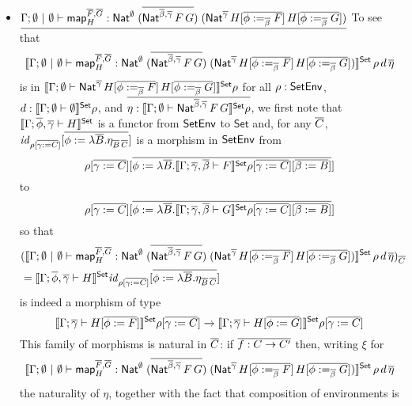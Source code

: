 \documentclass{lmcs}
\theoremstyle{plain}\newtheorem{satz}[thm]{Satz}
\newcommand{\set}{\mathsf{Set}}
\renewcommand{\id}{\mathit{id}}
\newcommand{\map}{\mathsf{map}}
\begin{document}
{\begin{itemize}
\item 
  $\underline{\Gamma;\emptyset~|~\emptyset \vdash
  \map^{\ol{F},\ol{G}}_H :
  \Nat^\emptyset\;(\ol{\Nat^{\ol{\beta},\ol{\gamma}}\,F\,G})\;
  (\Nat^{\ol{\gamma}}\,H[\ol{\phi :=_{\ol{\beta}} F}]\,H[\ol{\phi
      :=_{\ol{\beta}} G}])}$\;
To see that
\[
\setsem{\Gamma; \emptyset~|~\emptyset \vdash \map^{\ol{F},\ol{G}}_H
    : \Nat^\emptyset\;(\ol{\Nat^{\ol{\beta},\ol{\gamma}}\,F\,G})\;
    (\Nat^{\ol{\gamma}}\,H[\ol{\phi :=_{\ol{\beta}} F}]\,H[\ol{\phi
        :=_{\ol{\beta}} G}])}\,\rho\,d\, \ol{\eta}
\]
is in $\setsem{\Gamma; \emptyset \vdash
    \Nat^{\ol{\gamma}}\,H[\ol{\phi :=_{\ol{\beta}} F}]\,H[\ol{\phi
        :=_{\ol{\beta}} G}]} \rho$
for all $\rho : \mathsf{SetEnv}$, $d : \setsem{\Gamma;\emptyset \vdash \emptyset} \rho$,
and $\ol{\eta : \setsem{\Gamma; \emptyset
  \vdash\Nat^{\ol{\beta},\ol{\gamma}}\,F\,G} \rho}$,
  we first note that
$\setsem{\Gamma ;\ol{\phi}, \ol{\gamma} \vdash H}$ is a functor from
  $\mathsf{SetEnv}$ to $\set$ and, for any $\overline{C}$, $\id_{\rho[\ol{\gamma :=
        C}]}[\ol{\phi := \lambda \ol{B}. \eta_{\ol{B}\,\ol{C}}}]$ is a
  morphism in $\mathsf{SetEnv}$ from \[\rho[\ol{\gamma := C}][\ol{\phi :=
      \lambda \ol{B}.\setsem{\Gamma; \ol{\gamma},\ol{\beta} \vdash
        F}\rho[\ol{\gamma := C}][\ol{\beta := B}]}]\] to
\[\rho[\ol{\gamma := C}][\ol{\phi := \lambda \ol{B}.\setsem{\Gamma;
\ol{\gamma},\ol{\beta} \vdash G}\rho[\ol{\gamma := C}][\ol{\beta := B}]}]\]
so that
\begin{align*}
&(\setsem{\Gamma; \emptyset~|~\emptyset \vdash
  \map^{\ol{F},\ol{G}}_H :
\Nat^\emptyset\;(\ol{\Nat^{\ol{\beta},\ol{\gamma}}\,F\,G})\;
(\Nat^{\ol{\gamma}}\,H[\ol{\phi :=_{\ol{\beta}} F}]\,H[\ol{\phi
    :=_{\ol{\beta}} G}])}\,\rho\,d\, \ol{\eta})_{\ol{C}} \\
  &=  \setsem{\Gamma; \ol{\phi},\ol{\gamma} \vdash H}\id_{\rho[\ol{\gamma
      := C}]}[\ol{\phi := \lambda \ol{B}. \eta_{\ol{B}\,\ol{C}}}]
\end{align*}
is indeed a morphism of type
$$\setsem{\Gamma ;\ol{\gamma} \vdash H[\ol{\phi := F}]}\rho[\ol{\gamma
      := C}]%
\to 
\setsem{\Gamma ;\ol{\gamma} \vdash H[\ol{\phi := G}]}\rho[\ol{\gamma
      := C}]$$
This family of morphisms is natural in $\overline{C}$: if $\overline{f : C \to C'}$
then, writing $\xi$ for
\[
\setsem{\Gamma; \emptyset~|~\emptyset \vdash \map^{\ol{F},\ol{G}}_H
    : \Nat^\emptyset\;(\ol{\Nat^{\ol{\beta},\ol{\gamma}}\,F\,G})\;
    (\Nat^{\ol{\gamma}}\,H[\ol{\phi :=_{\ol{\beta}} F}]\,H[\ol{\phi
        :=_{\ol{\beta}} G}])}\,\rho\,d\, \ol{\eta}
\]
the naturality of $\eta$,
together with the fact that composition of environments is

\end{itemize}}
\end{document}
